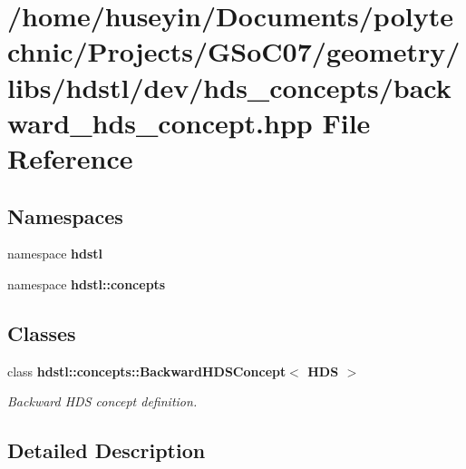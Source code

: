 \section{/home/huseyin/Documents/polytechnic/Projects/GSo\-C07/geometry/libs/hdstl/dev/hds\_\-concepts/backward\_\-hds\_\-concept.hpp File Reference}
\label{backward__hds__concept_8hpp}
\subsection*{Namespaces}
\begin{CompactItemize}
\item 
namespace \textbf{hdstl}
\item 
namespace \textbf{hdstl::concepts}
\end{CompactItemize}
\subsection*{Classes}
\begin{CompactItemize}
\item 
class \bf{hdstl::concepts::Backward\-HDSConcept$<$ HDS $>$}
\begin{CompactList}\small\item\em Backward HDS concept definition. \item\end{CompactList}\end{CompactItemize}


\subsection{Detailed Description}
